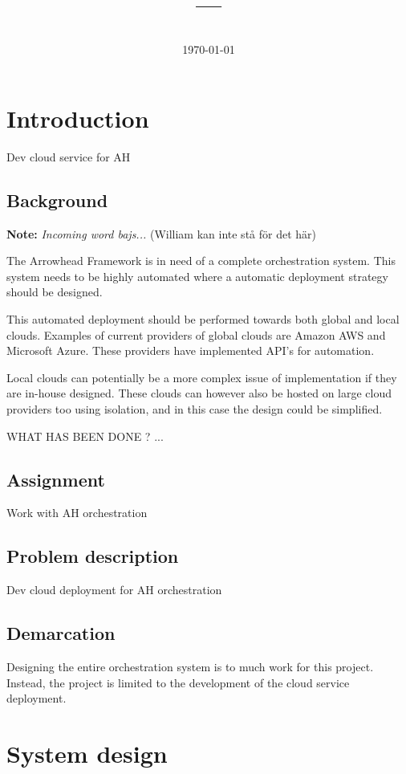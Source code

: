 \documentclass[a4paper,15pt,twoside]{article}
\title{\coursename{} --- \coursecode{} \break{}
  \projectname{}
  \author{\authorsinfo{}} \break{}
  \bigskip{} \break{}
  \schoolinfo{}}
\date{\today}
\begin{document}
\maketitle
\newpage

\begin{comment}
Deploy Docker container to Amazon AWS: http://docs.aws.amazon.com/AmazonECS/latest/developerguide/docker-basics.html
\end{comment}

\tableofcontents
\clearpage
\section{Introduction}
Dev cloud service for AH
\subsection{Background}
\textbf{Note:} \textit{Incoming word bajs...} (William kan inte stå för det här)

The Arrowhead Framework is in need of a complete orchestration system. This system needs to be highly automated where a automatic deployment strategy should be designed. 

This automated deployment should be performed towards both global and local clouds. Examples of current providers of global clouds are Amazon AWS and Microsoft Azure. These providers have implemented API's for automation. 

Local clouds can potentially be a more complex issue of implementation if they are in-house designed. These clouds can however also be hosted on large cloud providers too using isolation, and in this case the design could be simplified.

WHAT HAS BEEN DONE ? ... 

\subsection{Assignment}
Work with AH orchestration
\subsection{Problem description}
Dev cloud deployment for AH orchestration
\subsection{Demarcation}
Designing the entire orchestration system is to much work for this project. Instead, the project is limited to the development of the cloud service deployment.

\section{System design}
\end{document}
